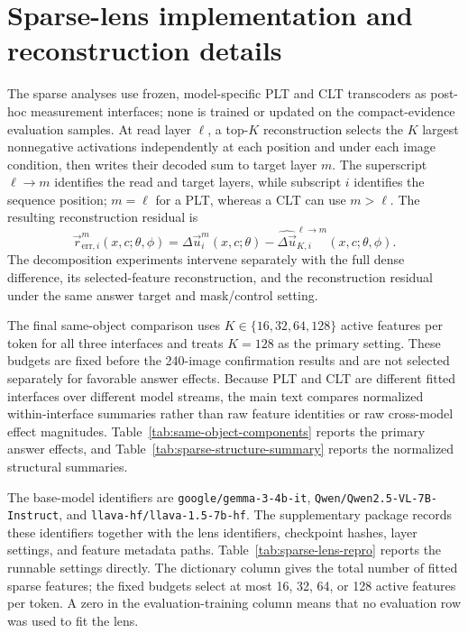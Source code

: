 \section{Sparse-lens implementation and reconstruction details}
\label{app:sparse-lens-details}

The sparse analyses use frozen, model-specific PLT and CLT transcoders as post-hoc measurement interfaces; none is trained or updated on the compact-evidence evaluation samples. At read layer $\ell$, a top-$K$ reconstruction selects the $K$ largest nonnegative activations independently at each position and under each image condition, then writes their decoded sum to target layer $m$. The superscript $\ell\rightarrow m$ identifies the read and target layers, while subscript $i$ identifies the sequence position; $m=\ell$ for a PLT, whereas a CLT can use $m>\ell$. The resulting reconstruction residual is
\[
\vec{r}_{\mathrm{err},i}^{m}(x,c;\theta,\phi)
=\Delta\vec{u}_{i}^{m}(x,c;\theta)
-\widehat{\Delta\vec{u}}_{K,i}^{\ell\rightarrow m}(x,c;\theta,\phi).
\]
The decomposition experiments intervene separately with the full dense difference, its selected-feature reconstruction, and the reconstruction residual under the same answer target and mask/control setting.

The final same-object comparison uses $K\in\{16,32,64,128\}$ active features per token for all three interfaces and treats $K=128$ as the primary setting. These budgets are fixed before the 240-image confirmation results and are not selected separately for favorable answer effects. Because PLT and CLT are different fitted interfaces over different model streams, the main text compares normalized within-interface summaries rather than raw feature identities or raw cross-model effect magnitudes. Table~\ref{tab:same-object-components} reports the primary answer effects, and Table~\ref{tab:sparse-structure-summary} reports the normalized structural summaries.

The base-model identifiers are \nolinkurl{google/gemma-3-4b-it}, \nolinkurl{Qwen/Qwen2.5-VL-7B-Instruct}, and \nolinkurl{llava-hf/llava-1.5-7b-hf}. The supplementary package records these identifiers together with the lens identifiers, checkpoint hashes, layer settings, and feature metadata paths. Table~\ref{tab:sparse-lens-repro} reports the runnable settings directly. The dictionary column gives the total number of fitted sparse features; the fixed budgets select at most 16, 32, 64, or 128 active features per token. A zero in the evaluation-training column means that no evaluation row was used to fit the lens.

